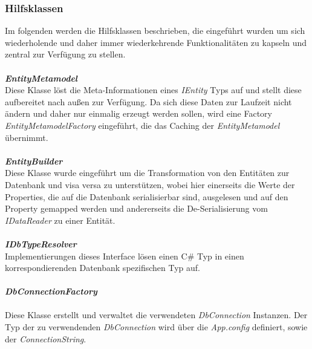 \documentclass[11pt, a4paper, twoside]{article}   	%
\begin{document}
\newpage
\subsubsection{Hilfsklassen}
Im folgenden werden die Hilfsklassen beschrieben, die eingeführt wurden um sich wiederholende und daher immer wiederkehrende Funktionalitäten zu kapseln und zentral zur Verfügung zu stellen.\\\\

\textbf{\emph{EntityMetamodel}}\\
Diese Klasse löst die Meta-Informationen eines \emph{IEntity} Typs auf und stellt diese aufbereitet nach außen zur Verfügung. Da sich diese Daten zur Laufzeit nicht ändern und daher nur einmalig erzeugt werden sollen, wird eine Factory \emph{EntityMetamodelFactory} eingeführt, die  das Caching der \emph{EntityMetamodel} übernimmt.\\\\

\textbf{\emph{EntityBuilder}}\\
Diese Klasse wurde eingeführt um die Transformation von den Entitäten zur Datenbank und visa versa zu unterstützen, wobei hier einerseits die Werte der Properties, die auf die Datenbank serialisierbar sind, ausgelesen und auf den Property gemapped werden und andererseits die De-Serialisierung vom \emph{IDataReader} zu einer Entität.\\\\

\textbf{\emph{IDbTypeResolver}}\\
Implementierungen dieses Interface lösen einen C\# Typ in einen korrespondierenden Datenbank spezifischen Typ auf.\\\\

\textbf{\emph{DbConnectionFactory}}\\\\
Diese Klasse erstellt und verwaltet die verwendeten \emph{DbConnection} Instanzen. Der Typ der zu verwendenden \emph{DbConnection} wird über die \emph{App.config} definiert, sowie der \emph{ConnectionString}.

\newpage
\end{document}
